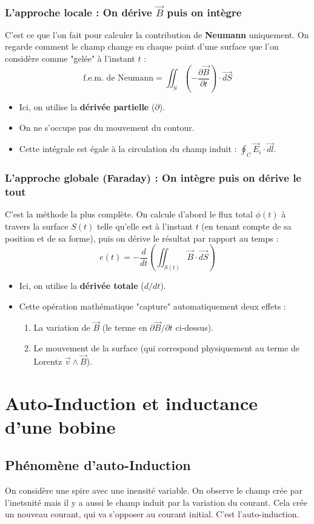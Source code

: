 \documentclass[french]{yLectureNote}
\renewcommand{\vec}{\overrightarrow}
\begin{document}
\subsubsection{L'approche locale : On dérive $\vec{B}$ puis on intègre}
C'est ce que l'on fait pour calculer la contribution de \textbf{Neumann} uniquement. On regarde comment le champ change en chaque point d'une surface que l'on considère comme "gelée" à l'instant $t$ :
$$\text{f.e.m. de Neumann} = \iint_{S} \left( -\frac{\partial \vec{B}}{\partial t} \right) \cdot \vec{dS}$$
\begin{itemize}
    \item Ici, on utilise la \textbf{dérivée partielle} ($\partial$).
    \item On ne s'occupe pas du mouvement du contour. 
    \item Cette intégrale est égale à la circulation du champ induit : $\oint_C \vec{E}_i \cdot \vec{dl}$.
\end{itemize}

\subsubsection{L'approche globale (Faraday) : On intègre puis on dérive le tout}
C'est la méthode la plus complète. On calcule d'abord le flux total $\phi(t)$ à travers la surface $S(t)$ telle qu'elle est à l'instant $t$ (en tenant compte de sa position et de sa forme), puis on dérive le résultat par rapport au temps :
$$e(t) = -\frac{d}{dt} \left( \iint_{S(t)} \vec{B} \cdot \vec{dS} \right)$$
\begin{itemize}
    \item Ici, on utilise la \textbf{dérivée totale} ($d/dt$).
    \item Cette opération mathématique "capture" automatiquement deux effets :
    \begin{enumerate}
        \item La variation de $\vec{B}$ (le terme en $\partial \vec{B} / \partial t$ ci-dessus).
        \item Le mouvement de la surface (qui correspond physiquement au terme de Lorentz $\vec{v} \wedge \vec{B}$).
    \end{enumerate}
\end{itemize}
\section{Auto-Induction et inductance d'une bobine}
\subsection{Phénomène d'auto-Induction}
On considère une spire avec une inensité variable. On observe le champ crée par l'inetsnité mais il y a aussi le 
champ induit par la variation du courant. Cela crée un nouveau courant, qui va s'opposer au courant initial. C'est l'auto-induction.
\end{document}
